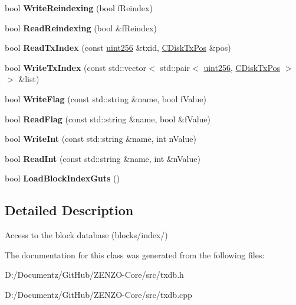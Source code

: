 \begin{DoxyCompactItemize}
\item 
\mbox{\label{class_c_block_tree_d_b_a8fa5d150b98f4fd1aa8cf503eddfccef}} 
bool {\bfseries Write\+Reindexing} (bool f\+Reindex)
\item 
\mbox{\label{class_c_block_tree_d_b_a1abf6fc392048428aa24a12b7942824b}} 
bool {\bfseries Read\+Reindexing} (bool \&f\+Reindex)
\item 
\mbox{\label{class_c_block_tree_d_b_a74383427266d627e84c2d0c8e21e03c7}} 
bool {\bfseries Read\+Tx\+Index} (const \mbox{\hyperlink{classuint256}{uint256}} \&txid, \mbox{\hyperlink{struct_c_disk_tx_pos}{C\+Disk\+Tx\+Pos}} \&pos)
\item 
\mbox{\label{class_c_block_tree_d_b_a1e03745f9675ad352a1483a0aa7ef308}} 
bool {\bfseries Write\+Tx\+Index} (const std\+::vector$<$ std\+::pair$<$ \mbox{\hyperlink{classuint256}{uint256}}, \mbox{\hyperlink{struct_c_disk_tx_pos}{C\+Disk\+Tx\+Pos}} $>$ $>$ \&list)
\item 
\mbox{\label{class_c_block_tree_d_b_af2f65b70ac5d8a198d4f29a7e909c08a}} 
bool {\bfseries Write\+Flag} (const std\+::string \&name, bool f\+Value)
\item 
\mbox{\label{class_c_block_tree_d_b_acd779c4653fd9a87fffe95d53ce7c6d3}} 
bool {\bfseries Read\+Flag} (const std\+::string \&name, bool \&f\+Value)
\item 
\mbox{\label{class_c_block_tree_d_b_aa2d6d0eae914f49212b8a439f099d331}} 
bool {\bfseries Write\+Int} (const std\+::string \&name, int n\+Value)
\item 
\mbox{\label{class_c_block_tree_d_b_a120ccdce99265a3c18096c521efe2420}} 
bool {\bfseries Read\+Int} (const std\+::string \&name, int \&n\+Value)
\item 
\mbox{\label{class_c_block_tree_d_b_a12be19bb1d7253eeb40e1aa88b032346}} 
bool {\bfseries Load\+Block\+Index\+Guts} ()
\end{DoxyCompactItemize}


\subsection{Detailed Description}
Access to the block database (blocks/index/) 

The documentation for this class was generated from the following files\+:\begin{DoxyCompactItemize}
\item 
D\+:/\+Documentz/\+Git\+Hub/\+Z\+E\+N\+Z\+O-\/\+Core/src/txdb.\+h\item 
D\+:/\+Documentz/\+Git\+Hub/\+Z\+E\+N\+Z\+O-\/\+Core/src/txdb.\+cpp\end{DoxyCompactItemize}
